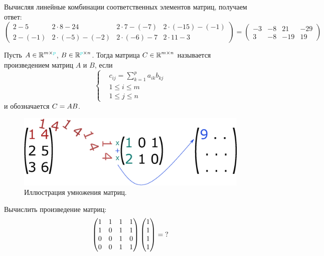 \documentclass[a4paper,12pt]{article}
\begin{document}
  \begin{solution}
    Вычисляя линейные комбинации соответственных элементов матриц, получаем ответ:
    \[
      \begin{pmatrix}
        2 - 5 & 2 \cdot 8 - 24 & 2 \cdot 7 - (-7) & 2 \cdot (-15) - (-1)\\
        2 - (-1) & 2 \cdot (-5) - (-2) & 2 \cdot (-6) - 7 & 2 \cdot 11 - 3
      \end{pmatrix}
      = \begin{pmatrix}
        -3 & -8 & 21 & -29\\
        3 & -8 & -19 & 19
      \end{pmatrix}
    \]
  \end{solution}
  
  
  \begin{definition}\label{def:matrix-multiplication}
    Пусть $A \hm\in \RR^{m \times \textcolor{light-cyan}{p}}$, $B \hm\in \RR^{\textcolor{light-cyan}{p} \times n}$.
    Тогда матрица $C \hm\in \RR^{m \times n}$ называется произведением матриц $A$ и $B$, если
    \[
      \left\{
        \begin{aligned}
          &c_{ij} = \sum_{k = 1}^p a_{ik} b_{kj}\\
          &1 \leq i \leq m\\
          &1 \leq j \leq n
        \end{aligned}
      \right.
    \]
    и обозначается $C \hm= AB$.
  \end{definition}

  \begin{figure}[h]
    \centering
    
    \includegraphics[width=0.5\columnwidth]{matrix-multiplication}
    
    \caption{Иллюстрация умножения матриц.}
    \label{fig:matrix-multiplication}
  \end{figure}
  
  
  \begin{problem}[15.5(9)]
    Вычислить произведение матриц:
    \[
      \begin{pmatrix}
        1 & 1 & 1 & 1\\
        1 & 0 & 1 & 1\\
        0 & 0 & 1 & 0\\
        0 & 0 & 1 & 1
      \end{pmatrix}
      \begin{pmatrix}
        1 \\ 1 \\ 1 \\ 1
      \end{pmatrix} = \operatorname{?}
    \]
  \end{problem}
\end{document}
